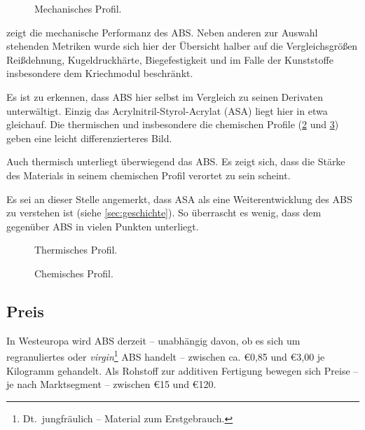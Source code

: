             \begin{figure}[h]
                \centering
                
                \caption{Mechanisches Profil.}
                \label{fig:pc mechanical profile}
            \end{figure}\par
             zeigt die mechanische Performanz des ABS\@. Neben anderen zur Auswahl stehenden
            Metriken wurde sich hier der Übersicht halber auf die Vergleichsgrößen Reißdehnung, Kugeldruckhärte, Biegefestigkeit
            und im Falle der Kunststoffe insbesondere dem Kriechmodul beschränkt.

            Es ist zu erkennen, dass ABS hier selbst im Vergleich zu seinen Derivaten unterwältigt. Einzig das
            Acrylnitril-Styrol-Acrylat (ASA) liegt hier in etwa gleichauf. Die thermischen und insbesondere die chemischen Profile
            (\cref{fig:pc thermal profile} und \cref{fig:pc chemical profile}) geben eine leicht differenzierteres Bild.

            Auch thermisch unterliegt überwiegend das ABS\@. Es zeigt sich, dass die Stärke des Materials in seinem chemischen
            Profil verortet zu sein scheint.

            Es sei an dieser Stelle angemerkt, dass ASA als eine Weiterentwicklung des ABS zu verstehen ist (siehe \cref{sec:geschichte}).
            So überrascht es wenig, dass dem gegenüber ABS in vielen Punkten unterliegt.
            \newpage
            \begin{figure}[H]
                \centering
                
                \caption{Thermisches Profil.}%
                \label{fig:pc thermal profile}
            \end{figure}
            \begin{figure}[H]
                \centering
                
                \caption{Chemisches Profil.}%
                \label{fig:pc chemical profile}
            \end{figure}
            \newpage
            \nocite{datenblattsammlung.KERN.20210201}
        \subsection{Preis}
            In Westeuropa wird ABS derzeit – unabhängig davon, ob es sich um regranuliertes oder \textit{virgin}\footnote{Dt.\ jungfräulich – Material zum Erstgebrauch.}
            ABS handelt – zwischen ca. €0,85 und €3,00 je Kilogramm gehandelt\cite{rohstoffboerse.kunststoffweb.de.20210206}.
            Als Rohstoff zur additiven Fertigung bewegen sich Preise – je nach Marktsegment – zwischen €15 und €120.

